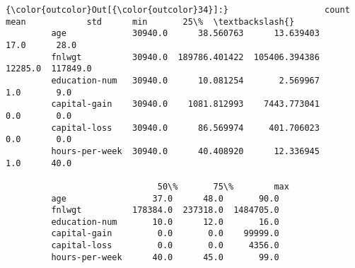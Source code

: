\documentclass[11pt]{article}
\begin{document}
\begin{Verbatim}[commandchars=\\\{\}]
{\color{outcolor}Out[{\color{outcolor}34}]:}                   count           mean            std      min       25\%  \textbackslash{}
         age             30940.0      38.560763      13.639403     17.0      28.0   
         fnlwgt          30940.0  189786.401422  105406.394386  12285.0  117849.0   
         education-num   30940.0      10.081254       2.569967      1.0       9.0   
         capital-gain    30940.0    1081.812993    7443.773041      0.0       0.0   
         capital-loss    30940.0      86.569974     401.706023      0.0       0.0   
         hours-per-week  30940.0      40.408920      12.336945      1.0      40.0   
         
                              50\%       75\%        max  
         age                 37.0      48.0       90.0  
         fnlwgt          178384.0  237318.0  1484705.0  
         education-num       10.0      12.0       16.0  
         capital-gain         0.0       0.0    99999.0  
         capital-loss         0.0       0.0     4356.0  
         hours-per-week      40.0      45.0       99.0  
\end{Verbatim}
            
\end{document}
